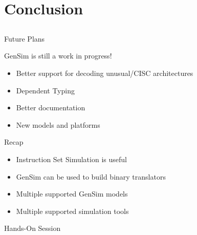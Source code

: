 \section{Conclusion}
\subsection{}

\begin{frame}{Future Plans}

GenSim is still a work in progress!

\begin{itemize}
\item Better support for decoding unusual/CISC architectures
\item Dependent Typing
\item Better documentation
\item New models and platforms
\end{itemize}

\end{frame}

\begin{frame}{Recap}

\begin{itemize}
\item<2-> Instruction Set Simulation is useful
\item<3-> GenSim can be used to build binary translators
\item<4-> Multiple supported GenSim models
\item<5-> Multiple supported simulation tools
\end{itemize}

\end{frame}

\begin{frame}{Hands-On Session}

\end{frame}
